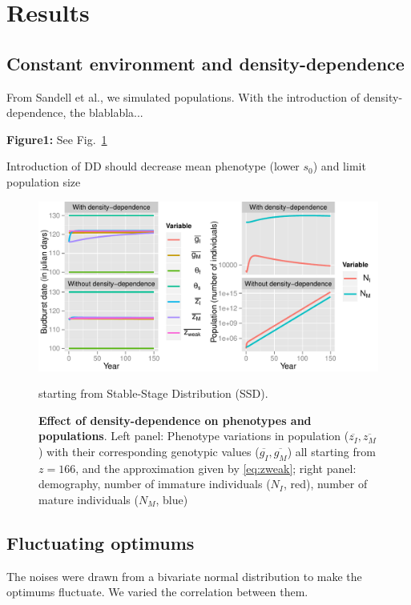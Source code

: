 \label{sec:Res}
\section*{Results}

\subsection*{Constant environment and density-dependence}

From Sandell et al., we simulated populations. With the introduction of density-dependence, the blablabla...

\textbf{Figure1:} See Fig.~\ref{fig:dd}

Introduction of DD should decrease mean phenotype (lower $s_{0}$) and limit population size

\begin{figure}[ht!]
	\centering
	\includegraphics[scale=1]{Figures/DDphenopop.pdf}
	\caption{\textbf{Effect of density-dependence on phenotypes and populations}. Left panel: Phenotype variations in population ($\overline{z_I}, \overline{z_M}$) with their corresponding genotypic values ($\overline{g_I}, \overline{g_M}$) all starting from $z = 166$, and the approximation given by \autoref{eq:zweak}; right panel: demography, number of immature individuals ($N_I$, red), number of mature individuals ($N_M$, blue)} starting from Stable-Stage Distribution (SSD).
	\label{fig:dd}
\end{figure}

\subsection*{Fluctuating optimums}

The noises were drawn from a bivariate normal distribution to make the optimums fluctuate. We varied the correlation between them.

